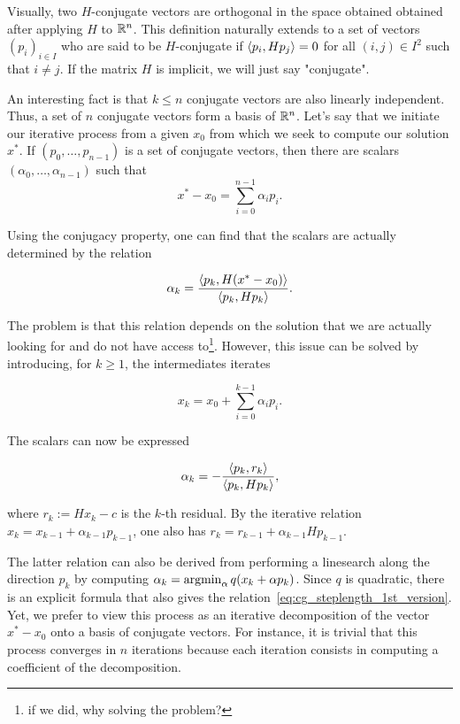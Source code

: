 \documentclass[10pt]{article}
\numberwithin{equation}{section}
\begin{document}
	Visually, two $H$-conjugate vectors are orthogonal in the space obtained obtained after applying $H$ to ${\mathbb{R}}^n$. This definition naturally extends to a set of vectors $(p_i)_{i\in I}$ who are said to be $H$-conjugate if $\left\langle {p_i} , {Hp_j} \right\rangle=0$ for all $(i,j) \in I^2$ such that $i\neq j$. If the matrix $H$ is implicit, we will just say "conjugate". 
	
	An interesting fact is that $k\le n$ conjugate vectors are also linearly independent. Thus, a set of $n$ conjugate vectors form a basis of ${\mathbb{R}}^n$. Let's say that we initiate our iterative process from a given $x_0$ from which we seek to compute our solution $x^*$. If $(p_0,\ldots,p_{n-1})$ is a set of conjugate vectors, then there are scalars $(\alpha_0,\ldots,\alpha_{n-1})$ such that
	\[ x^*-x_0 = \sum_{i=0}^{n-1} \alpha_i p_i.\]
	
	Using the conjugacy property, one can find that the scalars are actually determined by the relation
	
	\[ \alpha_k = \dfrac{\left\langle {p_k} , {H(x^*-x_0)} \right\rangle}{\left\langle {p_k} , {Hp_k} \right\rangle}.\]
	
	The problem is that this relation depends on the solution that we are actually looking for and do not have access to\footnote{if we did, why solving the problem?}. However, this issue can be solved by introducing, for $k\ge 1$, the intermediates iterates 
	
	\[ x_k = x_0 + \sum_{i=0}^{k-1} \alpha_i p_i.\]
	
	The scalars can now be expressed
	
	\begin{equation}\label{eq:cg_steplength_1st_version}
		\alpha_k = -\dfrac{\left\langle {p_k} , {r_k} \right\rangle}{\left\langle {p_k} , {Hp_k} \right\rangle},
	\end{equation}
	
	where $r_k := Hx_k - c$ is the $k$-th residual. By the iterative relation $x_{k} = x_{k-1}+\alpha_{k-1}p_{k-1}$, one also has $r_{k}=r_{k-1} + \alpha_{k-1}Hp_{k-1}$.
	
	The latter relation can also be derived from performing a linesearch along the direction $p_k$ by computing $\alpha_k = \operatorname*{argmin}_\alpha q(x_k + \alpha p_k)$. Since $q$ is quadratic, there is an explicit formula that also gives the relation~\eqref{eq:cg_steplength_1st_version}. Yet, we prefer to view this process as an iterative decomposition of the vector $x^*-x_0$ onto a basis of conjugate vectors. For instance, it is trivial that this process converges in $n$ iterations because each iteration consists in computing a coefficient of the decomposition. 
	
\end{document}
